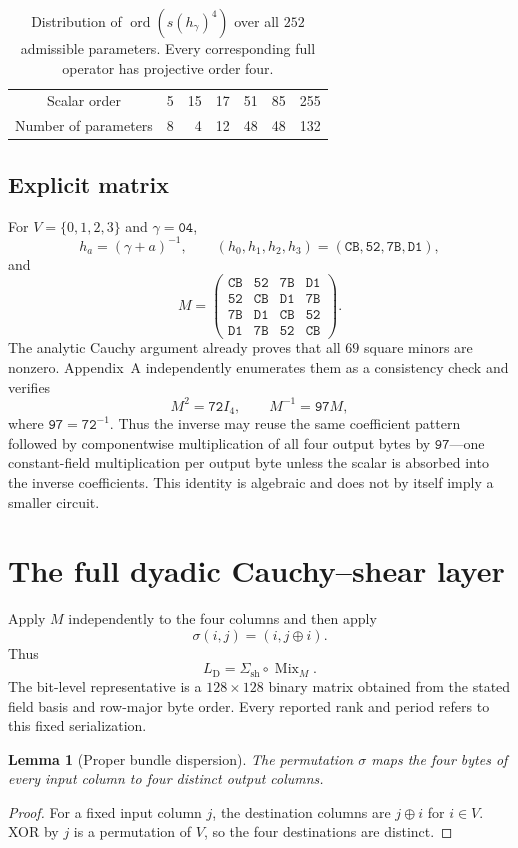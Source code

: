 \documentclass[10pt,reqno]{amsart}
\theoremstyle{plain}
\newtheorem{lemma}[theorem]{Lemma}
\theoremstyle{remark}\newtheorem{remark}[theorem]{Remark}
\theoremstyle{definition}\newtheorem{definition}[theorem]{Definition}
\newcommand{\hex}[1]{\mathtt{#1}}
\begin{document}
\begin{table}[t]
\centering
\caption{Distribution of \(\operatorname{ord}(s(h_\gamma)^4)\) over all \(252\) admissible parameters.  Every corresponding full operator has projective order four.}
\label{tab:gamma-family}
\begin{tabular}{c@{\qquad}rrrrrr}
\toprule
Scalar order & 5 & 15 & 17 & 51 & 85 & 255\\
Number of parameters & 8 & 4 & 12 & 48 & 48 & 132\\
\bottomrule
\end{tabular}
\end{table}

\subsection{Explicit matrix}
For $V=\{0,1,2,3\}$ and $\gamma=\hex{04}$,
\[
h_a=(\gamma+a)^{-1},\qquad
(h_0,h_1,h_2,h_3)=(\hex{CB},\hex{52},\hex{7B},\hex{D1}),
\]
and
\[
M=\begin{pmatrix}
\hex{CB}&\hex{52}&\hex{7B}&\hex{D1}\\
\hex{52}&\hex{CB}&\hex{D1}&\hex{7B}\\
\hex{7B}&\hex{D1}&\hex{CB}&\hex{52}\\
\hex{D1}&\hex{7B}&\hex{52}&\hex{CB}
\end{pmatrix}.
\]
The analytic Cauchy argument already proves that all $69$ square minors are nonzero. Appendix~A independently enumerates them as a consistency check and verifies
\[
M^2=\hex{72}I_4,\qquad M^{-1}=\hex{97}M,
\]
where $\hex{97}=\hex{72}^{-1}$. Thus the inverse may reuse the same coefficient pattern followed by componentwise multiplication of all four output bytes by $\hex{97}$---one constant-field multiplication per output byte unless the scalar is absorbed into the inverse coefficients. This identity is algebraic and does not by itself imply a smaller circuit.
\section{The full dyadic Cauchy--shear layer}
Apply $M$ independently to the four columns and then apply
\[
\sigma(i,j)=(i,j\oplus i).
\]
Thus
\[
L_{\mathrm{D}}=\Sigma_{\mathrm{sh}}\circ \operatorname{Mix}_M.
\]
The bit-level representative is a $128\times128$ binary matrix obtained from the stated field basis and row-major byte order. Every reported rank and period refers to this fixed serialization.

\begin{lemma}[Proper bundle dispersion]\label{lem:proper}
The permutation $\sigma$ maps the four bytes of every input column to four distinct output columns.
\end{lemma}
\begin{proof}
For a fixed input column $j$, the destination columns are $j\oplus i$ for $i\in V$. XOR by $j$ is a permutation of $V$, so the four destinations are distinct.
\end{proof}
\end{document}
